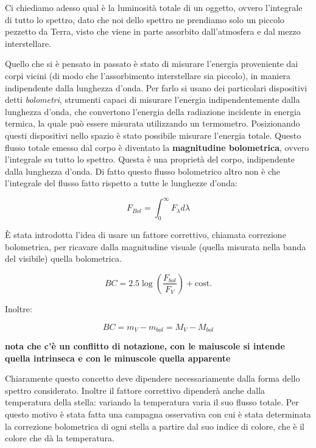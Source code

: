 Ci chiediamo adesso qual è la luminosità totale di un oggetto, ovvero l'integrale di tutto lo spettro, dato che noi dello spettro ne prendiamo solo un piccolo pezzetto da Terra, visto che viene in parte assorbito dall'atmosfera e dal mezzo interstellare.

Quello che si è pensato in passato è stato di misurare l'energia proveniente dai corpi vicini (di modo che l'assorbimento interstellare sia piccolo), in maniera indipendente dalla lunghezza d'onda. Per farlo si usano dei particolari dispositivi detti \textit{bolometri}, strumenti capaci di misurare l'energia indipendentemente dalla lunghezza d'onda, che convertono l'energia della radiazione incidente in energia termica, la quale può essere misurata utilizzando un termometro. Posizionando questi dispositivi nello spazio è stato possibile misurare l'energia totale. Questo flusso totale emesso dal corpo è diventato la \textbf{magnitudine bolometrica}, ovvero l'integrale su tutto lo spettro. Questa è una proprietà del corpo, indipendente dalla lunghezza d'onda. Di fatto questo flusso bolometrico altro non è che l'integrale del flusso fatto rispetto a tutte le lunghezze d'onda:

$$F_{Bol} = \int_0^{\infty} F_{\lambda} d\lambda$$

È stata introdotta l'idea di usare un fattore correttivo, chiamata correzione bolometrica, per ricavare dalla magnitudine visuale (quella misurata nella banda del visibile) quella bolometrica.

$$BC= 2.5 \log \left( \frac{F_{bol}}{F_V} \right) + \text{cost.}$$

Inoltre:

$$BC= m_V - m_{bol} = M_V - M_{bol}$$

\textbf{nota che c'è un conflitto di notazione, con le maiuscole si intende quella intrinseca e con le minuscole quella apparente}

Chiaramente questo concetto deve dipendere necessariamente dalla forma dello spettro considerato. Inoltre il fattore correttivo dipenderà anche dalla temperatura della stella: variando la temperatura varia il suo flusso totale. Per questo motivo è stata fatta una campagna osservativa con cui è stata determinata la correzione bolometrica di ogni stella a partire dal suo indice di colore, che è il colore che dà la temperatura.